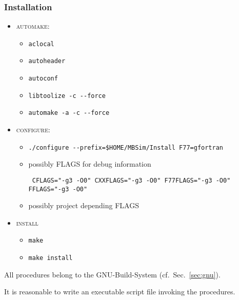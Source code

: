 \subsubsection{Installation}
\begin{itemize}
	\item \textsc{automake}:
	\begin{itemize}
		\item[] \begin{verbatim}aclocal\end{verbatim}
		\item[] \texttt{autoheader}
		\item[] \texttt{autoconf}
		\item[] \begin{verbatim}libtoolize -c --force\end{verbatim}
		\item[] \begin{verbatim}automake -a -c --force\end{verbatim}
	\end{itemize}
	\item \textsc{configure}: 
	\begin{itemize}
		\item[] \begin{verbatim}./configure --prefix=$HOME/MBSim/Install F77=gfortran \end{verbatim}
        \item[] possibly FLAGS for debug information
		        \begin{verbatim} CFLAGS="-g3 -O0" CXXFLAGS="-g3 -O0" F77FLAGS="-g3 -O0" FFLAGS="-g3 -O0" \end{verbatim}
		\item[] possibly project depending FLAGS
	\end{itemize}
	\item \textsc{install}
	\begin{itemize}	
		\item \begin{verbatim}make\end{verbatim}
		\item \begin{verbatim}make install\end{verbatim}
	\end{itemize}
\end{itemize}
All procedures belong to the GNU-Build-System (cf.~Sec.~\ref{sec:gnu}).\par
It is reasonable to write an executable script file invoking the procedures.

